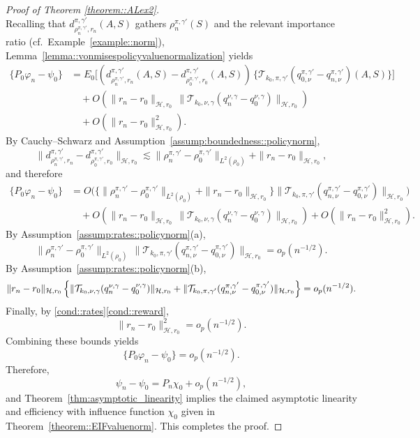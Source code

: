 \documentclass[11pt]{article}
\theoremstyle{plain}
\begin{document}
\begin{proof}[Proof of Theorem \ref{theorem::ALex2}]
\[\]
Recalling that $d_{\rho_n^{\pi,\gamma'},r_n}^{\pi,\gamma'}(A,S)$ gathers
$\rho_n^{\pi,\gamma'}(S)$ and the relevant importance ratio (cf.\ Example~\ref{example::norm}), 
Lemma~\ref{lemma::vonmisespolicyvaluenormalization} yields
\begin{align*} 
\{P_0 \varphi_n - \psi_0\}
&= E_0\!\Big[(d_{\rho_n^{\pi,\gamma'},r_n}^{\pi,\gamma'}(A,S) - d_{\rho_0^{\pi,\gamma'},r_0}^{\pi,\gamma'}(A,S))\,
           \{\mathcal{T}_{k_0,\pi,\gamma'}(q_{0,\nu}^{\pi,\gamma'} - q_{n,\nu}^{\pi,\gamma'})(A,S)\}\Big] \\
&\quad + O\!\left(\|r_n - r_0\|_{\mathcal{H},r_0}\,
        \|\mathcal{T}_{k_0,\nu,\gamma}(q_n^{\nu,\gamma} - q_0^{\nu,\gamma})\|_{\mathcal{H},r_0}\right) \\
&\quad + O\!\left(\|r_n - r_0\|_{\mathcal{H},r_0}^2\right).
\end{align*}
By Cauchy–Schwarz and Assumption~\ref{assump:boundedness::policynorm},
\[
\|d_{\rho_n^{\pi,\gamma'},r_n}^{\pi,\gamma'} - d_{\rho_0^{\pi,\gamma'},r_0}^{\pi,\gamma'}\|_{\mathcal{H},r_0}
\lesssim
\|\rho_n^{\pi,\gamma'} - \rho_0^{\pi,\gamma'}\|_{L^2(\rho_0)}
+ \|r_n - r_0\|_{\mathcal{H},r_0},
\]
and therefore
\begin{align*}
\{P_0 \varphi_n - \psi_0\}
&= O\!\Big(
   \bigl\{\|\rho_n^{\pi,\gamma'} - \rho_0^{\pi,\gamma'}\|_{L^2(\rho_0)}
          + \|r_n - r_0\|_{\mathcal{H},r_0}\bigr\}
   \bigl\|\mathcal{T}_{k_0,\pi,\gamma'}(q_{n,\nu}^{\pi,\gamma'} - q_{0,\nu}^{\pi,\gamma'})\bigr\|_{\mathcal{H},r_0}
   \Big) \\
&\quad + O\!\left(\|r_n - r_0\|_{\mathcal{H},r_0}\,
        \|\mathcal{T}_{k_0,\nu,\gamma}(q_n^{\nu,\gamma} - q_0^{\nu,\gamma})\|_{\mathcal{H},r_0}\right)
        + O\!\left(\|r_n - r_0\|_{\mathcal{H},r_0}^2\right).
\end{align*}
By Assumption~\ref{assump:rates::policynorm}(a),
\[
\|\rho_n^{\pi,\gamma'} - \rho_0^{\pi,\gamma'}\|_{L^2(\rho_0)}\,
\bigl\|\mathcal{T}_{k_0,\pi,\gamma'}(q_{n,\nu}^{\pi,\gamma'} - q_{0,\nu}^{\pi,\gamma'})\bigr\|_{\mathcal{H},r_0}
= o_p(n^{-1/2}).
\]
By Assumption~\ref{assump:rates::policynorm}(b),
\[
\|r_n - r_0\|_{\mathcal{H},r_0}\,
\Bigl\{
   \|\mathcal{T}_{k_0,\nu,\gamma}(q_n^{\nu,\gamma} - q_0^{\nu,\gamma})\|_{\mathcal{H},r_0}
   + \|\mathcal{T}_{k_0,\pi,\gamma'}(q_{n,\nu}^{\pi,\gamma'} - q_{0,\nu}^{\pi,\gamma'})\|_{\mathcal{H},r_0}
\Bigr\}
= o_p(n^{-1/2}).
\]
Finally, by \ref{cond::rates}\ref{cond::reward},
\[
\|r_n - r_0\|_{\mathcal{H},r_0}^2 = o_p(n^{-1/2}).
\]
Combining these bounds yields
\[
\{P_0 \varphi_n - \psi_0\} = o_p(n^{-1/2}).
\]
Therefore,
\[
\psi_n - \psi_0
= P_n \chi_0 + o_p(n^{-1/2}),
\]
and Theorem~\ref{thm:asymptotic_linearity} implies the claimed asymptotic linearity and efficiency with influence function $\chi_0$ given in Theorem~\ref{theorem::EIFvaluenorm}. This completes the proof.
\end{proof}
\end{document}
